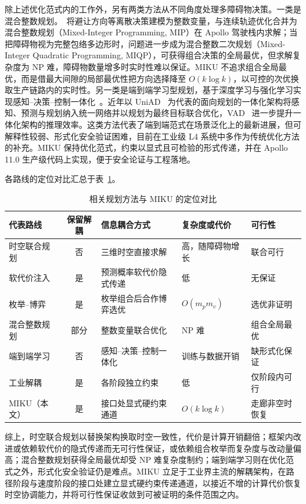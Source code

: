 \documentclass[a4paper,11pt]{ctexart}
\theoremstyle{definition}
\begin{document}
除上述优化范式内的工作外，另有两类方法从不同角度处理多障碍物决策。一类是混合整数规划。\citet{kessler2023}~将避让方向等离散决策建模为整数变量，与连续轨迹优化合并为混合整数规划（Mixed-Integer Programming, MIP）在 Apollo 驾驶栈内求解；当把障碍物视为完整包络多边形时，问题进一步成为混合整数二次规划（Mixed-Integer Quadratic Programming, MIQP），可获得组合决策的全局最优，但求解复杂度为 NP 难，障碍物数量增多时实时性难以保证。MIKU 不追求组合全局最优，而是借最大间隙的局部最优性把方向选择降至 $O(k\log k)$，以可控的次优换取生产链路内的实时性。另一类是端到端学习型规划，基于深度学习与强化学习实现感知--决策--控制一体化~\citep{li2024decision,zhang2018autonomous}。近年以 UniAD~\citep{hu2023uniad} 为代表的面向规划的一体化架构将感知、预测与规划纳入统一网络并以规划为最终目标联合优化，VAD~\citep{jiang2023vad} 进一步提升一体化架构的推理效率。这类方法代表了端到端范式在场景泛化上的最新进展，但可解释性较弱、形式化安全验证困难，目前在工业级 L4 系统中多作为传统优化方法的补充。MIKU 保持优化范式，约束以显式且可检验的形式传递，并在 Apollo 11.0 生产级代码上实现，便于安全论证与工程落地。

各路线的定位对比汇总于表~\ref{tab:related}。

\begin{table}[t]
\centering
\footnotesize
\setlength{\tabcolsep}{4pt}
\caption{相关规划方法与 MIKU 的定位对比}
\label{tab:related}
\begin{tabular}{@{}lcp{3.0cm}p{2.6cm}p{2.8cm}@{}}
\toprule
代表路线 & 保留解耦 & 信息耦合方式 & 复杂度或代价 & 可行性 \\
\midrule
时空联合规划 & 否 & 三维时空直接求解 & 高，随障碍物增长 & 联合可行 \\
软代价注入 & 是 & 预测概率软代价隐式传递 & 低 & 无保证 \\
枚举--博弈 & 是 & 枚举组合后合作博弈选优 & $O(m_p m_v)$ & 选优非证明 \\
混合整数规划 & 部分 & 整数变量联合优化 & NP 难 & 组合全局最优 \\
端到端学习 & 否 & 感知--决策--控制一体化 & 训练与数据开销 & 缺形式化保证 \\
工业解耦 & 是 & 各阶段独立约束 & 低 & 仅阶段内可行 \\
MIKU（本文） & 是 & 接口处显式硬约束通道 & $O(k\log k)$ & 走廊非空时恢复 \\
\bottomrule
\end{tabular}
\end{table}

综上，时空联合规划以替换架构换取时空一致性，代价是计算开销翻倍；框架内改进或依赖软代价的隐式传递而无可行性保证，或依赖组合枚举而复杂度与改动量偏高；混合整数规划获得全局最优却受 NP 难复杂度制约；端到端学习则在优化范式之外，形式化安全验证仍是难点。MIKU 立足于工业界主流的解耦架构，在路径阶段与速度阶段的接口处建立显式硬约束传递通道，以接近不增的计算代价恢复时空协调能力，并将可行性保证收敛到可被证明的条件范围之内。
\end{document}
